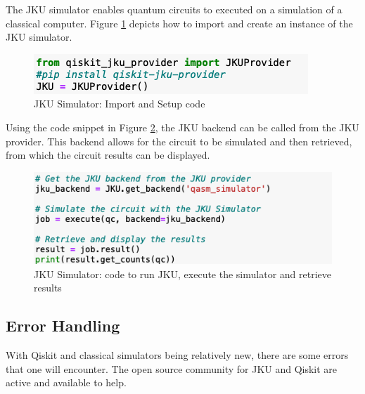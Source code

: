 
The JKU simulator enables quantum circuits to executed on a simulation of a classical computer. Figure \ref{JK1} depicts how to import and create an instance of the JKU simulator.

\begin{figure}[H]
      \centering
      \includegraphics[scale=0.7]{background/JK1.png}
      \caption{JKU Simulator: Import and Setup code  }
      \label{JK1}
\end{figure}

Using the code snippet in Figure \ref{JK2}, the JKU backend can be called from the JKU provider. This backend allows for the circuit to be simulated and then retrieved, from which the circuit results can be displayed.%
\begin{figure}[H]
      \centering
      \includegraphics[scale=0.6]{background/JK2.png}
      \caption{JKU Simulator: code to run JKU, execute the simulator and retrieve results}
      \label{JK2}
\end{figure}
\vspace{0.4cm}



\subsection{Error Handling}

With Qiskit and classical simulators being relatively new, there are some errors that one will encounter. The open source community for JKU and Qiskit are active and available to help.


